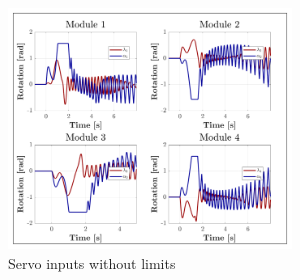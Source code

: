 \begin{figure}[hbtp]
\vspace{-8pt}
\centering
\includegraphics[width=0.67\textwidth]{graphs/saturated-servos}
\vspace{-6pt}
\caption{Servo inputs without limits}
\label{fig:saturated-servos}
\vspace{-24pt}
\end{figure}
